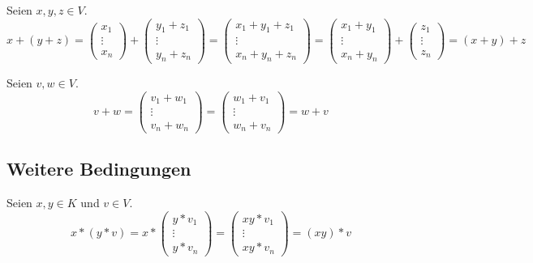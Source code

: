 \documentclass[a4paper,10pt]{article}
\begin{document}
Seien $x, y, z \in V$.
\begin{equation*}
 x + (y + z) = \begin{pmatrix}x_1 \\ \vdots \\ x_n\end{pmatrix} + \begin{pmatrix}y_1 + z_1 \\ \vdots \\ y_n + z_n\end{pmatrix} = \begin{pmatrix}x_1 + y_1 + z_1 \\ \vdots \\ x_n + y_n + z_n\end{pmatrix} = \begin{pmatrix}x_1 + y_1 \\ \vdots \\ x_n + y_n\end{pmatrix} + \begin{pmatrix}z_1 \\ \vdots \\ z_n\end{pmatrix} = (x + y) + z
\end{equation*}

Seien $v, w \in V$.
\begin{equation*}
 v + w = \begin{pmatrix}v_1 + w_1 \\ \vdots \\ v_n + w_n \end{pmatrix} = \begin{pmatrix}w_1 + v_1 \\ \vdots \\ w_n + v_n \end{pmatrix} = w + v
\end{equation*}

\subsection*{Weitere Bedingungen}

Seien $x, y \in K$ und $v \in V$.
\begin{equation*}
 x * (y * v) = x * \begin{pmatrix}y * v_1 \\ \vdots \\ y * v_n\end{pmatrix} = \begin{pmatrix} xy * v_1 \\ \vdots \\ xy * v_n\end{pmatrix} = (xy) * v
\end{equation*}
\end{document}
